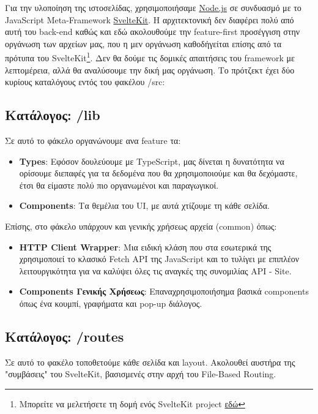 Για την υλοποίηση της ιστοσελίδας, χρησιμοποιήσαμε \href{https://nodejs.org/en}{\textlatin{Node.js}} σε συνδυασμό με το \textlatin{JavaScript Meta-Framework} \href{https://svelte.dev/}{\textlatin{SvelteKit}}. Η αρχιτεκτονική δεν διαφέρει πολύ από αυτή του \textlatin{back-end} καθώς και εδώ ακολουθούμε την \textlatin{feature-first} προσέγγιση στην οργάνωση των αρχείων μας, που η μεν οργάνωση καθοδήγείται επίσης από τα πρότυπα του \textlatin{SvelteKit}\footnote{Μπορείτε να μελετήσετε τη δομή ενός \textlatin{SvelteKit project} \href{https://svelte.dev/docs/kit/project-structure}{εδώ}}. Δεν θα δούμε τις δομικές απαιτήσεις του \textlatin{framework} με λεπτομέρεια, αλλά θα αναλύσουμε την δική μας οργάνωση. Το πρότζεκτ έχει δύο κυρίους καταλόγους εντός του φακέλου \textlatin{/src}:

\subsection{Κατάλογος: \textlatin{/lib}}
Σε αυτό το φάκελο οργανώνουμε ανα \textlatin{feature} τα:
\begin{itemize}
    \item \textlatin{\textbf{Types}}: Εφόσον δουλεύουμε με \textlatin{TypeScript}, μας δίνεται η δυνατότητα να ορίσουμε διεπαφές για τα δεδομένα που θα χρησιμοποιούμε και θα δεχόμαστε, έτσι θα είμαστε πολύ πιο οργανωμένοι και παραγωγικοί.
    \item \textlatin{\textbf{Components}}: Τα θεμέλια του \textlatin{UI}, με αυτά χτίζουμε τη κάθε σελίδα.
\end{itemize}
Επίσης, στο φάκελο υπάρχουν και γενικής χρήσεως αρχεία (\textlatin{common}) όπως:
\begin{itemize}
    \item \textlatin{\textbf{HTTP Client Wrapper}}: Μια ειδική κλάση που στα εσωτερικά της χρησιμοποιεί το κλασικό \textlatin{Fetch API} της \textlatin{JavaScript} και το τυλίγει με επιπλέον λειτουργικότητα για να καλύψει όλες τις αναγκές της συνομιλίας \textlatin{API - Site}.
    \item \textbf{\textlatin{Components} Γενικής Χρήσεως}: Επαναχρησιμοποιήσημα βασικά \textlatin{components} όπως ένα κουμπί, γραφήματα και \textlatin{pop-up} διάλογος.
\end{itemize}
\subsection{Κατάλογος: \textlatin{/routes}}
Σε αυτό το φακέλο τοποθετούμε κάθε σελίδα και \textlatin{layout}. Ακολουθεί αυστήρα της "συμβάσεις" του \textlatin{SvelteKit}, βασισμενές στην αρχή του \textlatin{File-Based Routing}.